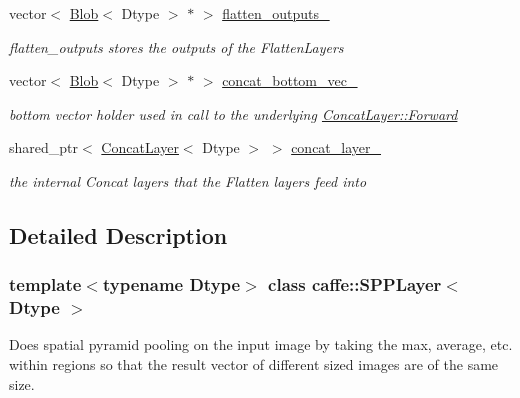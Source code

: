 \begin{DoxyCompactItemize}
\mbox{\label{classcaffe_1_1_s_p_p_layer_a570487cca969b921de0c7b94cb7828cc}} 
vector$<$ \mbox{\hyperlink{classcaffe_1_1_blob}{Blob}}$<$ Dtype $>$ $\ast$ $>$ \mbox{\hyperlink{classcaffe_1_1_s_p_p_layer_a570487cca969b921de0c7b94cb7828cc}{flatten\+\_\+outputs\+\_\+}}
\begin{DoxyCompactList}\small\item\em flatten\+\_\+outputs stores the outputs of the Flatten\+Layers \end{DoxyCompactList}\item 
\mbox{\label{classcaffe_1_1_s_p_p_layer_a17d3d8b3ea6fbcf4db4cefa775dea229}} 
vector$<$ \mbox{\hyperlink{classcaffe_1_1_blob}{Blob}}$<$ Dtype $>$ $\ast$ $>$ \mbox{\hyperlink{classcaffe_1_1_s_p_p_layer_a17d3d8b3ea6fbcf4db4cefa775dea229}{concat\+\_\+bottom\+\_\+vec\+\_\+}}
\begin{DoxyCompactList}\small\item\em bottom vector holder used in call to the underlying \mbox{\hyperlink{classcaffe_1_1_layer_ab57d272dabe8c709d2a785eebe72ca57}{Concat\+Layer\+::\+Forward}} \end{DoxyCompactList}\item 
\mbox{\label{classcaffe_1_1_s_p_p_layer_a77249333fc51f12914ec68e27b989974}} 
shared\+\_\+ptr$<$ \mbox{\hyperlink{classcaffe_1_1_concat_layer}{Concat\+Layer}}$<$ Dtype $>$ $>$ \mbox{\hyperlink{classcaffe_1_1_s_p_p_layer_a77249333fc51f12914ec68e27b989974}{concat\+\_\+layer\+\_\+}}
\begin{DoxyCompactList}\small\item\em the internal Concat layers that the Flatten layers feed into \end{DoxyCompactList}\end{DoxyCompactItemize}


\subsection{Detailed Description}
\subsubsection*{template$<$typename Dtype$>$\newline
class caffe\+::\+S\+P\+P\+Layer$<$ Dtype $>$}

Does spatial pyramid pooling on the input image by taking the max, average, etc. within regions so that the result vector of different sized images are of the same size. 

